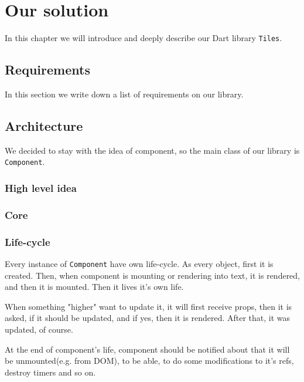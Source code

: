 \chapter{Our solution}\label{chap:oursolution}

In this chapter we will introduce and deeply describe our Dart library \texttt{Tiles}.


\section{Requirements}\label{subsec:our-architecture-requirements}

  In this section we write down a list of requirements on our library.

\section{Architecture}\label{sec:our-architecture}

  We decided to stay with the idea of component, so the main class of our library is \texttt{Component}.

  \subsection{High level idea}\label{subsec:our-architecture-idea}
  \subsection{Core}\label{subsec:our-architecture-core}
  \subsection{Life-cycle}\label{subsec:our-architecture-lifecycle}

    Every instance of \texttt{Component} have own life-cycle. 
    As every object, first it is created. 
    Then, when component is mounting or rendering into text, it is rendered, and then it is mounted.
    Then it lives it's own life. 

    When something "higher" want to update it, it will first receive props, 
    then it is asked, if it should be updated, and if yes, then it is rendered.
    After that, it was updated, of course.

    At the end of component's life, 
    component should be notified about that it will be unmounted(e.g. from DOM), 
    to be able, to do some modifications to it's refs, destroy timers and so on. 


